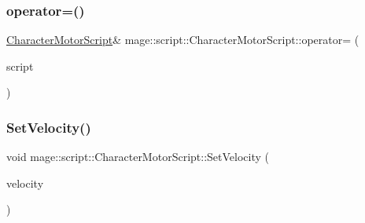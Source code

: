 \hypertarget{classmage_1_1script_1_1_character_motor_script_a00ca2aa38ca4a2557a783ffc31068801}{}\label{classmage_1_1script_1_1_character_motor_script_a00ca2aa38ca4a2557a783ffc31068801} 
\subsubsection{\texorpdfstring{operator=()}{operator=()}\hspace{0.1cm}{\footnotesize\ttfamily [2/2]}}
{\footnotesize\ttfamily \hyperlink{classmage_1_1script_1_1_character_motor_script}{Character\+Motor\+Script}\& mage\+::script\+::\+Character\+Motor\+Script\+::operator= (\begin{DoxyParamCaption}\item[{\hyperlink{classmage_1_1script_1_1_character_motor_script}{Character\+Motor\+Script} \&\&}]{script }\end{DoxyParamCaption})\hspace{0.3cm}{\ttfamily [delete]}}

\hypertarget{classmage_1_1script_1_1_character_motor_script_a51c9b8317670fc0ae554bfb0cac11aee}{}\label{classmage_1_1script_1_1_character_motor_script_a51c9b8317670fc0ae554bfb0cac11aee} 
\subsubsection{\texorpdfstring{Set\+Velocity()}{SetVelocity()}}
{\footnotesize\ttfamily void mage\+::script\+::\+Character\+Motor\+Script\+::\+Set\+Velocity (\begin{DoxyParamCaption}\item[{\hyperlink{namespacemage_aa97e833b45f06d60a0a9c4fc22ae02c0}{F32}}]{velocity }\end{DoxyParamCaption})\hspace{0.3cm}{\ttfamily [noexcept]}}

\hypertarget{classmage_1_1script_1_1_character_motor_script_a75683c4b8db184174b48dd7e4989c016}{}\label{classmage_1_1script_1_1_character_motor_script_a75683c4b8db184174b48dd7e4989c016} 
